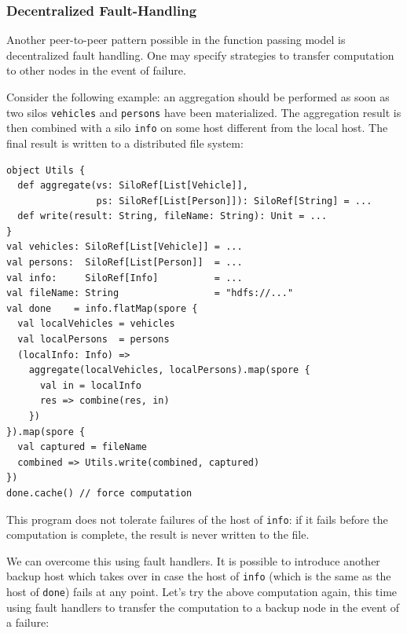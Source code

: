 \documentclass[preprint]{sigplanconf}
\theoremstyle{definition}
\theoremstyle{definition}
\begin{document}
\subsubsection{Decentralized Fault-Handling}

Another peer-to-peer pattern possible in the function passing model is
decentralized fault handling. One may specify strategies to transfer computation
to other nodes in the event of failure.

Consider the following example: an aggregation should be performed as
soon as two silos \verb|vehicles| and \verb|persons| have been
materialized. The aggregation result is then combined with a silo
\verb|info| on some host different from the local host. The final
result is written to a distributed file system:

\begin{lstlisting}
object Utils {
  def aggregate(vs: SiloRef[List[Vehicle]],
                ps: SiloRef[List[Person]]): SiloRef[String] = ...
  def write(result: String, fileName: String): Unit = ...
}
val vehicles: SiloRef[List[Vehicle]] = ...
val persons:  SiloRef[List[Person]]  = ...
val info:     SiloRef[Info]          = ...
val fileName: String                 = "hdfs://..."
val done    = info.flatMap(spore {
  val localVehicles = vehicles
  val localPersons  = persons
  (localInfo: Info) =>
    aggregate(localVehicles, localPersons).map(spore {
      val in = localInfo
      res => combine(res, in)
    })
}).map(spore {
  val captured = fileName
  combined => Utils.write(combined, captured)
})
done.cache() // force computation
\end{lstlisting}
\noindent
This program does not tolerate failures of the host of \verb|info|: if
it fails before the computation is complete, the result is never
written to the file.

We can overcome this using fault handlers. It is possible to introduce
another backup host which takes over in case the host of \verb|info|
(which is the same as the host of \verb|done|) fails at any
point. Let's try the above computation again, this time using fault
handlers to transfer the computation to a backup node in the event of
a failure:
\end{document}
